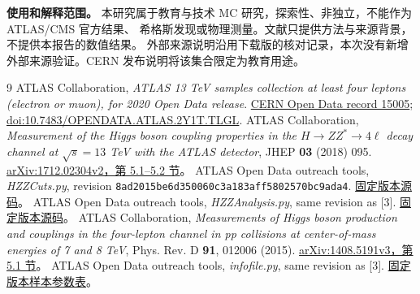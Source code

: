 \documentclass[11pt,a4paper,fontset=fandol,scheme=plain]{ctexart}
\begin{document}
\textbf{使用和解释范围。} 本研究属于教育与技术 MC 研究，探索性、非独立，不能作为 ATLAS/CMS 官方结果、
希格斯发现或物理测量。文献只提供方法与来源背景，不提供本报告的数值结果。
外部来源说明沿用下载版的核对记录，本次没有新增外部来源验证。CERN 发布说明将该集合限定为教育用途。

\begingroup\footnotesize
\renewcommand{\refname}{参考来源}
\begin{thebibliography}{9}
 ATLAS Collaboration, \emph{ATLAS 13 TeV samples collection at least four leptons (electron or muon), for 2020 Open Data release}.
\href{https://opendata.cern.ch/record/15005}{CERN Open Data record 15005};
\href{https://doi.org/10.7483/OPENDATA.ATLAS.2Y1T.TLGL}{doi:10.7483/OPENDATA.ATLAS.2Y1T.TLGL}.
 ATLAS Collaboration, \emph{Measurement of the Higgs boson coupling properties in the $H\to ZZ^*\to4\ell$ decay channel at $\sqrt{s}=13$ TeV with the ATLAS detector}, JHEP \textbf{03} (2018) 095.
\href{https://arxiv.org/pdf/1712.02304v2#page=8}{arXiv:1712.02304v2，第 5.1--5.2 节}。
 ATLAS Open Data outreach tools, \emph{HZZCuts.py}, revision \texttt{8ad2015be6d350060c3a183aff5802570bc9ada4}.
\href{https://github.com/atlas-outreach-data-tools/atlas-outreach-Python-uproot-framework-13tev/blob/8ad2015be6d350060c3a183aff5802570bc9ada4/HZZCuts.py#L2-L33}{固定版本源码}。
 ATLAS Open Data outreach tools, \emph{HZZAnalysis.py}, same revision as [3].
\href{https://github.com/atlas-outreach-data-tools/atlas-outreach-Python-uproot-framework-13tev/blob/8ad2015be6d350060c3a183aff5802570bc9ada4/HZZAnalysis.py#L140-L168}{固定版本源码}。
 ATLAS Collaboration, \emph{Measurements of Higgs boson production and couplings in the four-lepton channel in pp collisions at center-of-mass energies of 7 and 8 TeV}, Phys. Rev. D \textbf{91}, 012006 (2015).
\href{https://arxiv.org/pdf/1408.5191v3#page=7}{arXiv:1408.5191v3，第 5.1 节}。
 ATLAS Open Data outreach tools, \emph{infofile.py}, same revision as [3].
\href{https://github.com/atlas-outreach-data-tools/atlas-outreach-Python-uproot-framework-13tev/blob/8ad2015be6d350060c3a183aff5802570bc9ada4/infofile.py}{固定版本样本参数表}。
\end{thebibliography}
\endgroup
\end{document}
